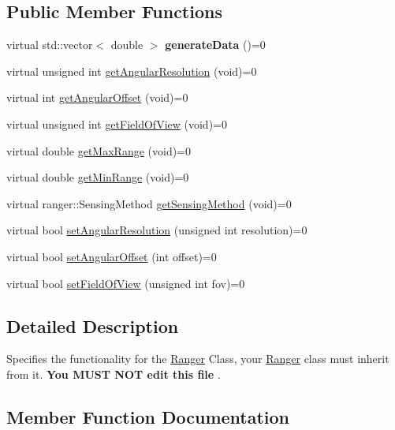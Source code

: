 \subsection*{Public Member Functions}
\begin{DoxyCompactItemize}
\item 
virtual std\+::vector$<$ double $>$ {\bfseries generate\+Data} ()=0\hypertarget{classRangerInterface_a969c670cadf55a15733809116dc305c8}{}\label{classRangerInterface_a969c670cadf55a15733809116dc305c8}

\item 
virtual unsigned int \hyperlink{classRangerInterface_a37d4f89daffa8b2708dfc11034893552}{get\+Angular\+Resolution} (void)=0
\item 
virtual int \hyperlink{classRangerInterface_a3af867912dfc4f2cf899f53b82e85130}{get\+Angular\+Offset} (void)=0
\item 
virtual unsigned int \hyperlink{classRangerInterface_a18716da6932402b8dda75f682be6f06c}{get\+Field\+Of\+View} (void)=0
\item 
virtual double \hyperlink{classRangerInterface_a0bb29a41de5767c99081002c0590c186}{get\+Max\+Range} (void)=0
\item 
virtual double \hyperlink{classRangerInterface_ae6d501ddeeaad4a7b44d7d51ce64cb88}{get\+Min\+Range} (void)=0
\item 
virtual ranger\+::\+Sensing\+Method \hyperlink{classRangerInterface_aeb06b9835f2b162b81917bd27797549b}{get\+Sensing\+Method} (void)=0
\item 
virtual bool \hyperlink{classRangerInterface_aecffc9bbb58379da741c18326b9e41db}{set\+Angular\+Resolution} (unsigned int resolution)=0
\item 
virtual bool \hyperlink{classRangerInterface_a2ac537778d99306a378d151c544426dc}{set\+Angular\+Offset} (int offset)=0
\item 
virtual bool \hyperlink{classRangerInterface_a70357ca516198af45e2d503ef6af8f9f}{set\+Field\+Of\+View} (unsigned int fov)=0
\end{DoxyCompactItemize}


\subsection{Detailed Description}
Specifies the functionality for the \hyperlink{classRanger}{Ranger} Class, your \hyperlink{classRanger}{Ranger} class must inherit from it. {\bfseries  You M\+U\+ST N\+OT edit this file }. 

\subsection{Member Function Documentation}

